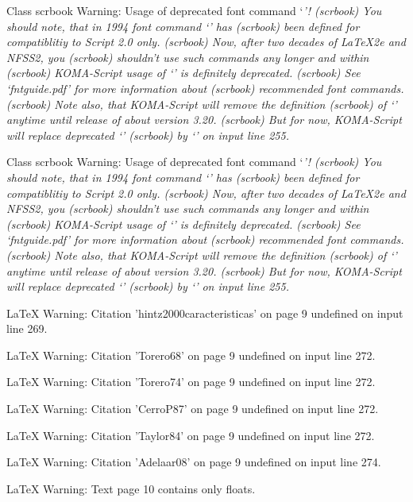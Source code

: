 Class scrbook Warning: Usage of deprecated font command `\it'!
(scrbook)              You should note, that in 1994 font command `\it' has
(scrbook)              been defined for compatiblitiy to Script 2.0 only.
(scrbook)              Now, after two decades of LaTeX2e and NFSS2, you
(scrbook)              shouldn't use such commands any longer and within
(scrbook)              KOMA-Script usage of `\it' is definitely deprecated.
(scrbook)              See `fntguide.pdf' for more information about
(scrbook)              recommended font commands.
(scrbook)              Note also, that KOMA-Script will remove the definition
(scrbook)              of `\it' anytime until release of about version 3.20.
(scrbook)              But for now, KOMA-Script will replace deprecated `\it'
(scrbook)              by `\normalfont \itshape ' on input line 255.


Class scrbook Warning: Usage of deprecated font command `\it'!
(scrbook)              You should note, that in 1994 font command `\it' has
(scrbook)              been defined for compatiblitiy to Script 2.0 only.
(scrbook)              Now, after two decades of LaTeX2e and NFSS2, you
(scrbook)              shouldn't use such commands any longer and within
(scrbook)              KOMA-Script usage of `\it' is definitely deprecated.
(scrbook)              See `fntguide.pdf' for more information about
(scrbook)              recommended font commands.
(scrbook)              Note also, that KOMA-Script will remove the definition
(scrbook)              of `\it' anytime until release of about version 3.20.
(scrbook)              But for now, KOMA-Script will replace deprecated `\it'
(scrbook)              by `\normalfont \itshape ' on input line 255.


LaTeX Warning: Citation 'hintz2000caracteristicas' on page 9 undefined on input line 269.


LaTeX Warning: Citation 'Torero68' on page 9 undefined on input line 272.


LaTeX Warning: Citation 'Torero74' on page 9 undefined on input line 272.


LaTeX Warning: Citation 'CerroP87' on page 9 undefined on input line 272.


LaTeX Warning: Citation 'Taylor84' on page 9 undefined on input line 272.


LaTeX Warning: Citation 'Adelaar08' on page 9 undefined on input line 274.


LaTeX Warning: Text page 10 contains only floats.


